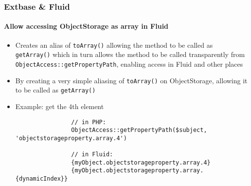 \begin{frame}[fragile]
	\frametitle{Extbase \& Fluid}
	\framesubtitle{Allow accessing ObjectStorage as array in Fluid}

	\lstset{basicstyle=\tiny\ttfamily}

	\begin{itemize}

		\item Creates an alias of \texttt{toArray()} allowing the method to be
			called as \texttt{getArray()} which in turn allows the method to be
			called transparently from \texttt{ObjectAccess::getPropertyPath},
			enabling access in Fluid and other places

		\item By creating a very simple aliasing of \texttt{toArray()} on
			ObjectStorage, allowing it to be called as \texttt{getArray()}

		\item Example: get the 4th element

			\begin{lstlisting}
				// in PHP:
				ObjectAccess::getPropertyPath($subject, 'objectstorageproperty.array.4')

				// in Fluid:
				{myObject.objectstorageproperty.array.4}
				{myObject.objectstorageproperty.array.{dynamicIndex}}
			\end{lstlisting}

	\end{itemize}

\end{frame}

